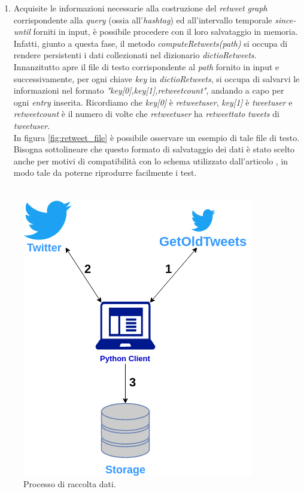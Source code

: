 \begin{enumerate}
\item Acquisite le informazioni necessarie alla costruzione del \textit{retweet graph} corrispondente alla \textit{query} (ossia all'\textit{hashtag}) ed all'intervallo temporale \textit{since-until} forniti in input, è possibile procedere con il loro salvataggio in memoria. Infatti, giunto a questa fase, il metodo \textit{computeRetweets(path)} si occupa di rendere persistenti i dati collezionati nel dizionario \textit{dictioRetweets}. Innanzitutto apre il file di testo corrispondente al \textit{path} fornito in input e successivamente, per ogni chiave \textit{key} in \textit{dictioRetweets}, si occupa di salvarvi le informazioni nel formato \textit{"key[0],key[1],retweetcount"}, andando a capo per ogni \textit{entry} inserita. Ricordiamo che \textit{key[0]} è \textit{retweetuser}, \textit{key[1]} è \textit{tweetuser} e \textit{retweetcount} è il numero di volte che \textit{retweetuser} ha \textit{retweettato} \textit{tweets} di \textit{tweetuser}.
\\In figura \ref{fig:retweet_file} è possibile osservare un esempio di tale file di testo.
\\Bisogna sottolineare che questo formato di salvataggio dei dati è stato scelto anche per motivi di compatibilità con lo schema utilizzato dall'articolo \cite{garimella:paper}, in modo tale da poterne riprodurre facilmente i test.
\\\\
\end{enumerate}

\begin{figure}
\begin{center}
\includegraphics[scale=0.6]{images/raccolta_dati_tesi.png}
\end{center}
\caption{Processo di raccolta dati.}
\label{fig:raccolta_dati}
\end{figure}

